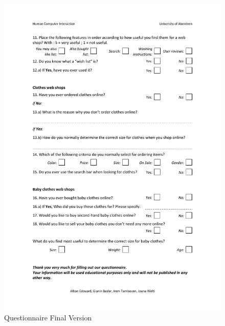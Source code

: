 \begin{figure}[t]
\centering
\includegraphics[width=1.0\textwidth]{User_Involvement_Methods/Questionnaires/Questionnaire_Web_Shops_v3_2.pdf}
\caption{Questionnaire Final Version}
\label{fig:final}
\end{figure}